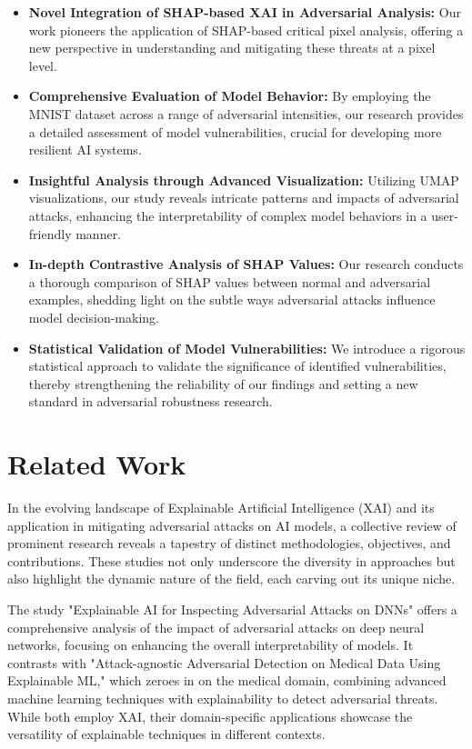 \documentclass[10pt, conference, a4paper, final]{IEEEtran}
\begin{document}
\begin{itemize}
    \item \textbf{Novel Integration of SHAP-based XAI in Adversarial Analysis:} Our work pioneers the application of SHAP-based critical pixel analysis, offering a new perspective in understanding and mitigating these threats at a pixel level.
    
    \item \textbf{Comprehensive Evaluation of Model Behavior:} By employing the MNIST dataset across a range of adversarial intensities, our research provides a detailed assessment of model vulnerabilities, crucial for developing more resilient AI systems.
    
    \item \textbf{Insightful Analysis through Advanced Visualization:} Utilizing UMAP visualizations, our study reveals intricate patterns and impacts of adversarial attacks, enhancing the interpretability of complex model behaviors in a user-friendly manner.
    
    \item \textbf{In-depth Contrastive Analysis of SHAP Values:} Our research conducts a thorough comparison of SHAP values between normal and adversarial examples, shedding light on the subtle ways adversarial attacks influence model decision-making.
    
    \item \textbf{Statistical Validation of Model Vulnerabilities:} We introduce a rigorous statistical approach to validate the significance of identified vulnerabilities, thereby strengthening the reliability of our findings and setting a new standard in adversarial robustness research.

\end{itemize}

\section{Related Work}
In the evolving landscape of Explainable Artificial Intelligence (XAI) and its application in mitigating adversarial attacks on AI models, a collective review of prominent research reveals a tapestry of distinct methodologies, objectives, and contributions. These studies not only underscore the diversity in approaches but also highlight the dynamic nature of the field, each carving out its unique niche.

The study "Explainable AI for Inspecting Adversarial Attacks on DNNs" offers a comprehensive analysis of the impact of adversarial attacks on deep neural networks, focusing on enhancing the overall interpretability of models. It contrasts with "Attack-agnostic Adversarial Detection on Medical Data Using Explainable ML," which zeroes in on the medical domain, combining advanced machine learning techniques with explainability to detect adversarial threats. While both employ XAI, their domain-specific applications showcase the versatility of explainable techniques in different contexts.
\end{document}
